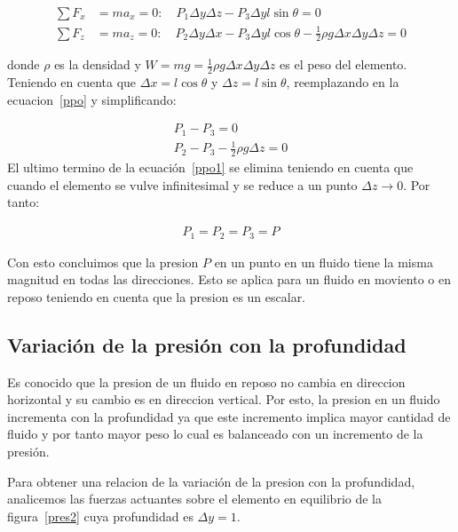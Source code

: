 \documentclass[10pt, oneside]{article}
\begin{document}
\begin{equation}
\begin{split}
\sum F_x &= ma_x = 0: \quad P_1 \Delta y \Delta z - P_3 \Delta y l \sin \theta = 0 \\
\sum F_z &= ma_z = 0: \quad P_2 \Delta y \Delta x - P_3 \Delta y l \cos \theta - \frac{1}{2}\rho g \Delta x \Delta y \Delta z = 0
\label{ppo}
\end{split}
\end{equation}

donde $\rho$ es la densidad y $W = mg = \frac{1}{2} \rho g \Delta x \Delta y \Delta z$ es el peso del elemento. Teniendo en cuenta que $\Delta x = l \cos \theta$ y $\Delta z = l \sin \theta$, reemplazando en la ecuacion~\ref{ppo} y simplificando:

\begin{equation}
\begin{split}
P_1 - P_3 = 0 \\
P_2 - P_3 - \frac{1}{2}\rho g \Delta z = 0
\label{ppo1}
\end{split}
\end{equation}
El ultimo termino de la ecuaci\'on~\ref{ppo1} se elimina teniendo en cuenta que cuando el elemento se vulve infinitesimal y se reduce a un punto $\Delta z \rightarrow 0$. Por tanto:

\begin{equation}
\begin{split}
P_1 = P_2 = P_3 = P
\label{ppo2}
\end{split}
\end{equation}

Con esto concluimos que la presion $P$ en un punto en un fluido tiene la misma magnitud en todas las direcciones. Esto se aplica para un fluido en moviento o en reposo teniendo en cuenta que la presion es un escalar. 

\subsection{Variaci\'on de la presi\'on con la profundidad}
Es conocido que la presion de un fluido en reposo no cambia en direccion horizontal y su cambio es en direccion vertical. Por esto, la presion en un fluido incrementa con la profundidad ya que este incremento implica mayor cantidad de fluido y por tanto mayor peso lo cual es balanceado con un incremento de la presi\'on.

Para obtener una relacion de la variaci\'on de la presion con la profundidad, analicemos las fuerzas actuantes sobre el elemento en equilibrio de la figura~\ref{pres2} cuya profundidad es $\Delta y =1$. 
\end{document}
